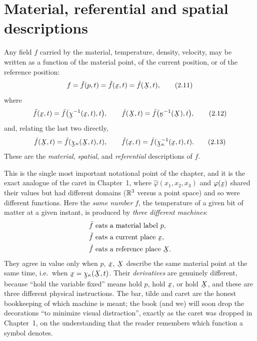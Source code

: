 \section{Material, referential and spatial descriptions}\label{sec:desc}

Any field $f$ carried by the material, temperature, density, velocity, may
be written as a function of the material point, of the current position, or
of the reference position:
\begin{equation}
   f=\bar f(p,t)=\tilde f(\bx,t)=\hat f(\bX,t), \tag{2.11}\label{eq:2.11}
\end{equation}
where
\begin{equation}
   \tilde f(\bx,t)=\bar f\big(\bchi^{-1}(\bx,t),t\big),\qquad
   \hat f(\bX,t)=\bar f\big(\bkappa^{-1}(\bX),t\big), \tag{2.12}\label{eq:2.12}
\end{equation}
and, relating the last two directly,
\begin{equation}
   \hat f(\bX,t)=\tilde f(\bchi_\kappa(\bX,t),t),\qquad
   \tilde f(\bx,t)=\hat f(\bchi_\kappa^{-1}(\bx,t),t). \tag{2.13}\label{eq:2.13}
\end{equation}
These are the \emph{material}, \emph{spatial}, and \emph{referential}
descriptions of $f$.

\begin{remark}\label{rem:decorations}
This is the single most important notational point of the chapter, and it is
the exact analogue of the caret in Chapter~1, where $\hat\varphi(x_1,x_2,x_3)$
and $\varphi(\bx)$ shared their values but had different domains
($\mathbb{R}^3$ versus a point space) and so were different functions. Here the
\emph{same number} $f$, the temperature of a given bit of matter at a given
instant, is produced by \emph{three different machines}:
\[
\begin{aligned}
&\bar f\ \text{eats a material label }p,\\
&\tilde f\ \text{eats a current place }\bx,\\
&\hat f\ \text{eats a reference place }\bX .
\end{aligned}
\]
They agree in value only when $p$, $\bx$, $\bX$ describe the same material
point at the same time, i.e.\ when $\bx=\bchi_\kappa(\bX,t)$. Their
\emph{derivatives} are genuinely different, because ``hold the variable
fixed'' means hold $p$, hold $\bx$, or hold $\bX$, and these are three
different physical instructions. The bar, tilde and caret are the honest
bookkeeping of which machine is meant; the book (and we) will soon drop the
decorations ``to minimize visual distraction'', exactly as the caret was
dropped in Chapter~1, on the understanding that the reader remembers which
function a symbol denotes.
\end{remark}

